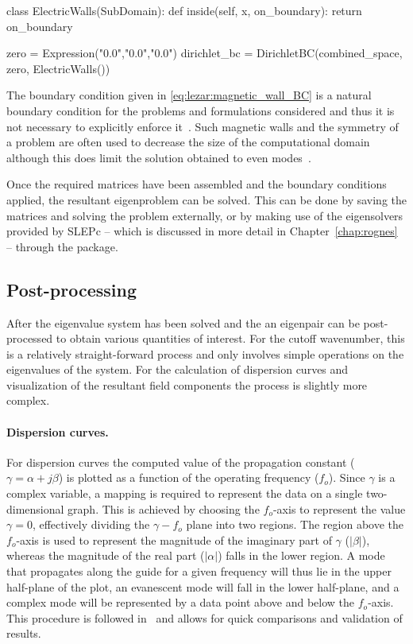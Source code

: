 \begin{python}
class ElectricWalls(SubDomain):
    def inside(self, x, on_boundary):
        return on_boundary

zero = Expression("0.0","0.0","0.0")
dirichlet_bc = DirichletBC(combined_space, zero, ElectricWalls())
\end{python}

The boundary condition given in \eqref{eq:lezar:magnetic_wall_BC} is a
natural boundary condition for the problems and formulations
considered and thus it is not necessary to explicitly enforce
it~\citep{PelosiCoccioliSelleri1998}. Such magnetic walls and the
symmetry of a problem are often used to decrease the size of the
computational domain although this does limit the solution obtained to
even modes~\citep{Jin2002}.

Once the required matrices have been assembled and the boundary
conditions applied, the resultant eigenproblem can be solved. This can
be done by saving the matrices and solving the problem externally, or
by making use of the eigensolvers provided by SLEPc -- which is
discussed in more detail in Chapter~\ref{chap:rognes} -- through
the \fenics{} package.

\subsection{Post-processing}

After the eigenvalue system has been solved and the an eigenpair can
be post-processed to obtain various quantities of interest. For the
cutoff wavenumber, this is a relatively
straight-forward process and only involves simple operations on the
eigenvalues of the system. For the calculation of dispersion curves
and visualization of the resultant field components the process is
slightly more complex.

\paragraph{Dispersion curves.}

For dispersion curves the computed value of the propagation constant
($\gamma = \alpha + j\beta$) is plotted as a function of the operating
frequency ($f_o$). Since $\gamma$ is a complex variable, a mapping is
required to represent the data on a single two-dimensional graph. This
is achieved by choosing the $f_o$-axis to represent the value $\gamma
= 0$, effectively dividing the {$\gamma-f_o$} plane into two
regions. The region above the $f_o$-axis is used to represent the
magnitude of the imaginary part of $\gamma$ ($|\beta|$), whereas the
magnitude of the real part ($|\alpha|$) falls in the lower region. A
mode that propagates along the guide for a given frequency will thus
lie in the upper half-plane of the plot, an evanescent mode will fall
in the lower half-plane, and a complex mode will be represented by a
data point above and below the $f_o$-axis.  This procedure is followed
in~\citet{PelosiCoccioliSelleri1998} and allows for quick comparisons
and validation of results.

